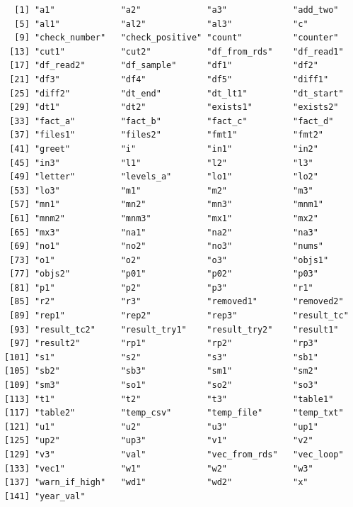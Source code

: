 \documentclass[
  letterpaper,
  DIV=11,
  numbers=noendperiod]{scrartcl}
\begin{document}
\begin{verbatim}
  [1] "a1"             "a2"             "a3"             "add_two"       
  [5] "al1"            "al2"            "al3"            "c"             
  [9] "check_number"   "check_positive" "count"          "counter"       
 [13] "cut1"           "cut2"           "df_from_rds"    "df_read1"      
 [17] "df_read2"       "df_sample"      "df1"            "df2"           
 [21] "df3"            "df4"            "df5"            "diff1"         
 [25] "diff2"          "dt_end"         "dt_lt1"         "dt_start"      
 [29] "dt1"            "dt2"            "exists1"        "exists2"       
 [33] "fact_a"         "fact_b"         "fact_c"         "fact_d"        
 [37] "files1"         "files2"         "fmt1"           "fmt2"          
 [41] "greet"          "i"              "in1"            "in2"           
 [45] "in3"            "l1"             "l2"             "l3"            
 [49] "letter"         "levels_a"       "lo1"            "lo2"           
 [53] "lo3"            "m1"             "m2"             "m3"            
 [57] "mn1"            "mn2"            "mn3"            "mnm1"          
 [61] "mnm2"           "mnm3"           "mx1"            "mx2"           
 [65] "mx3"            "na1"            "na2"            "na3"           
 [69] "no1"            "no2"            "no3"            "nums"          
 [73] "o1"             "o2"             "o3"             "objs1"         
 [77] "objs2"          "p01"            "p02"            "p03"           
 [81] "p1"             "p2"             "p3"             "r1"            
 [85] "r2"             "r3"             "removed1"       "removed2"      
 [89] "rep1"           "rep2"           "rep3"           "result_tc"     
 [93] "result_tc2"     "result_try1"    "result_try2"    "result1"       
 [97] "result2"        "rp1"            "rp2"            "rp3"           
[101] "s1"             "s2"             "s3"             "sb1"           
[105] "sb2"            "sb3"            "sm1"            "sm2"           
[109] "sm3"            "so1"            "so2"            "so3"           
[113] "t1"             "t2"             "t3"             "table1"        
[117] "table2"         "temp_csv"       "temp_file"      "temp_txt"      
[121] "u1"             "u2"             "u3"             "up1"           
[125] "up2"            "up3"            "v1"             "v2"            
[129] "v3"             "val"            "vec_from_rds"   "vec_loop"      
[133] "vec1"           "w1"             "w2"             "w3"            
[137] "warn_if_high"   "wd1"            "wd2"            "x"             
[141] "year_val"      
\end{verbatim}
\end{document}
